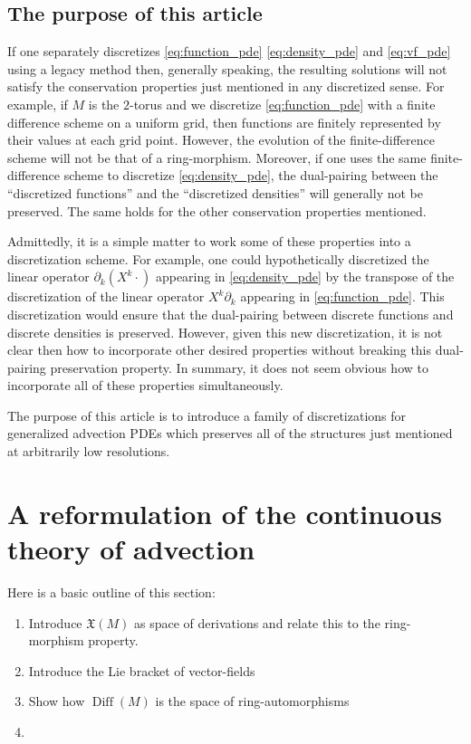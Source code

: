 \documentclass[12pt]{amsart}
\DeclareMathOperator{\Diff}{Diff}
\begin{document}
\subsection{The purpose of this article}
\label{sec:purpose}
If one separately discretizes \eqref{eq:function_pde} \eqref{eq:density_pde} and \eqref{eq:vf_pde} using a legacy method
then, generally speaking, the resulting solutions will not satisfy the conservation properties just mentioned in any discretized sense.
For example, if $M$ is the $2$-torus and we discretize \eqref{eq:function_pde} with a finite difference scheme on a uniform grid,
then functions are finitely represented by their values at each grid point.
However, the evolution of the finite-difference scheme will not be that of a ring-morphism.
Moreover, if one uses the same finite-difference scheme to discretize \eqref{eq:density_pde}, the dual-pairing between the 
``discretized functions'' and the ``discretized densities'' will generally not be preserved.
The same holds for the other conservation properties mentioned.

Admittedly, it is a simple matter to work some of these properties into a discretization scheme.
For example, one could hypothetically discretized the linear operator  $\partial_k (X^k \cdot )$ appearing in \eqref{eq:density_pde} by the transpose of the
discretization of the linear operator $X^k \partial_k$ appearing in \eqref{eq:function_pde}.
This discretization would ensure that the dual-pairing between discrete functions and discrete densities is preserved.
However, given this new discretization,
it is not clear then how to incorporate other desired properties without breaking this dual-pairing preservation property.
In summary, it does not seem obvious how to incorporate all of these properties simultaneously.

The purpose of this article is to introduce a family of discretizations for generalized advection PDEs
which preserves all of the structures just mentioned at arbitrarily low resolutions.

\section{A reformulation of the continuous theory of advection}
\label{sec:continous}

Here is a basic outline of this section:
\begin{enumerate}
	\item Introduce $\mathfrak{X}(M)$ as space of derivations and relate this to the ring-morphism property.
	\item Introduce the Lie bracket of vector-fields
	\item Show how $\Diff(M)$ is the space of ring-automorphisms
	\item 
\end{enumerate}
\end{document}
